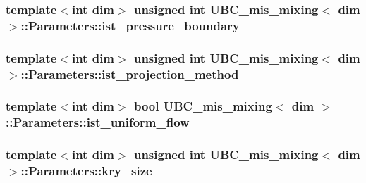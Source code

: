 \subsubsection[{ist\+\_\+pressure\+\_\+boundary}]{\setlength{\rightskip}{0pt plus 5cm}template$<$int dim$>$ unsigned int {\bf U\+B\+C\+\_\+mis\+\_\+mixing}$<$ dim $>$\+::Parameters\+::ist\+\_\+pressure\+\_\+boundary}\label{struct_u_b_c__mis__mixing_1_1_parameters_ad7f05e11567b4ffcca1ab6d6d25e93cd}
\hypertarget{struct_u_b_c__mis__mixing_1_1_parameters_a621dda8ef2f8b914fc76b16da67d4869}{}
\subsubsection[{ist\+\_\+projection\+\_\+method}]{\setlength{\rightskip}{0pt plus 5cm}template$<$int dim$>$ unsigned int {\bf U\+B\+C\+\_\+mis\+\_\+mixing}$<$ dim $>$\+::Parameters\+::ist\+\_\+projection\+\_\+method}\label{struct_u_b_c__mis__mixing_1_1_parameters_a621dda8ef2f8b914fc76b16da67d4869}
\hypertarget{struct_u_b_c__mis__mixing_1_1_parameters_a04908c7866d4e382771eef213f59ff4b}{}
\subsubsection[{ist\+\_\+uniform\+\_\+flow}]{\setlength{\rightskip}{0pt plus 5cm}template$<$int dim$>$ bool {\bf U\+B\+C\+\_\+mis\+\_\+mixing}$<$ dim $>$\+::Parameters\+::ist\+\_\+uniform\+\_\+flow}\label{struct_u_b_c__mis__mixing_1_1_parameters_a04908c7866d4e382771eef213f59ff4b}
\hypertarget{struct_u_b_c__mis__mixing_1_1_parameters_adfd3cf708a892fea49d74dc2da238197}{}
\subsubsection[{kry\+\_\+size}]{\setlength{\rightskip}{0pt plus 5cm}template$<$int dim$>$ unsigned int {\bf U\+B\+C\+\_\+mis\+\_\+mixing}$<$ dim $>$\+::Parameters\+::kry\+\_\+size}\label{struct_u_b_c__mis__mixing_1_1_parameters_adfd3cf708a892fea49d74dc2da238197}
\hypertarget{struct_u_b_c__mis__mixing_1_1_parameters_a1fb7274b6cc0e9ae893a3eab78c1e570}{}
